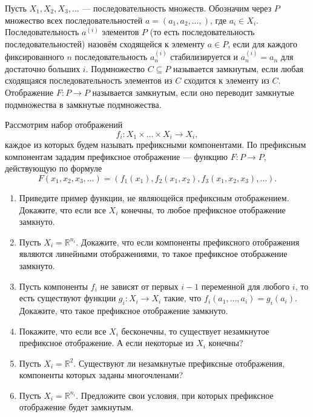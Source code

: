 
Пусть $X_1, X_2, X_3, \ldots$ --- последовательность множеств. Обозначим через $P$ множество всех последовательностей $a=(a_1, a_2, \ldots, )$, где $a_i \in X_i$. Последовательность $a^{(i)}$ элементов $P$ (то есть последовательность последовательностей) назовём сходящейся к элементу $a \in P$, если для каждого фиксированного $n$ последовательность $a_n^{(i)}$ стабилизируется и $a_n^{(i)} = a_n$ для достаточно больших $i$. Подмножество $C \subseteq P$ называется замкнутым, если любая сходящаяся последовательность элементов из $C$ сходится к элементу из $C$. Отображение $F: P \to P$ называется замкнутым, если оно переводит замкнутые подмножества в замкнутые подмножества. 

Рассмотрим набор отображений
$$f_i: X_1 \times \ldots \times X_i \longrightarrow X_i, $$ 
каждое из которых будем называть префиксными компонентами. По префиксным компонентам зададим префиксное отображение --- функцию $F: P \to P$, действующую по формуле
$$F(x_1, x_2, x_3, \ldots) = (f_1(x_1), f_2(x_1,x_2), f_3(x_1, x_2, x_3), \ldots).$$ 

\begin{enumerate}
\item Приведите пример функции, не являющейся префиксным отображением. Докажите, что если все $X_i$ конечны, то любое префиксное отображение замкнуто. 
\item Пусть $X_i = \mathbb{R}^{n_i}$. Докажите, что если компоненты префиксного отображения являются линейными отображениями, то такое префиксное отображение замкнуто.
\item Пусть компоненты $f_i$ не зависят от первых $i-1$ переменной для любого $i$, то есть существуют функции $g_i:X_i \to X_i$ такие, что $f_i(a_1, \ldots, a_i) = g_i(a_i)$. Докажите, что такое префиксное отображение замкнуто.
\item Покажите, что если все $X_i$ бесконечны, то существует незамкнутое префиксное отображение. А если некоторые из $X_i$ конечны?
\item Пусть $X_i = \mathbb{R}^2$. Существуют ли незамкнутые префиксные отображения, компоненты которых заданы многочленами?
\item Пусть $X_i = \mathbb{R}^{n_i}$. Предложите свои условия, при которых префиксное отображение будет замкнутым. 
\end{enumerate}